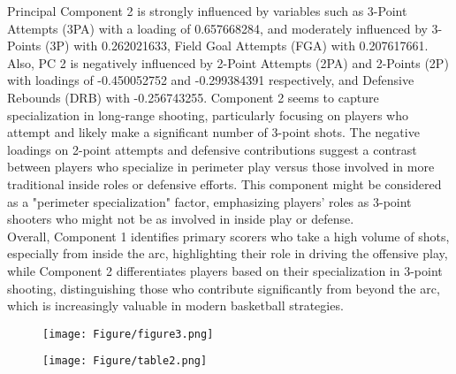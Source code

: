 \documentclass[fleqn,10pt]{SelfArx} %
\begin{document}
Principal Component 2 is strongly influenced by variables such as 3-Point Attempts (3PA) with a loading of 0.657668284, and moderately influenced by 3-Points (3P) with 0.262021633, Field Goal Attempts (FGA) with 0.207617661. Also, PC 2 is negatively influenced by 2-Point Attempts (2PA) and 2-Points (2P) with loadings of -0.450052752 and -0.299384391 respectively, and Defensive Rebounds (DRB) with -0.256743255. Component 2 seems to capture specialization in long-range shooting, particularly focusing on players who attempt and likely make a significant number of 3-point shots. The negative loadings on 2-point attempts and defensive contributions suggest a contrast between players who specialize in perimeter play versus those involved in more traditional inside roles or defensive efforts. This component might be considered as a "perimeter specialization" factor, emphasizing players' roles as 3-point shooters who might not be as involved in inside play or defense.\\
Overall, Component 1 identifies primary scorers who take a high volume of shots, especially from inside the arc, highlighting their role in driving the offensive play, while Component 2 differentiates players based on their specialization in 3-point shooting, distinguishing those who contribute significantly from beyond the arc, which is increasingly valuable in modern basketball strategies.\\
\begin{figure}[ht]
    \centering
    \texttt{[image: Figure/figure3.png]}
    \label{fig:enter-label}
\end{figure}
\begin{figure}[ht]
    \centering
    \texttt{[image: Figure/table2.png]}
    \label{fig:enter-label}
\end{figure}
\end{document}
